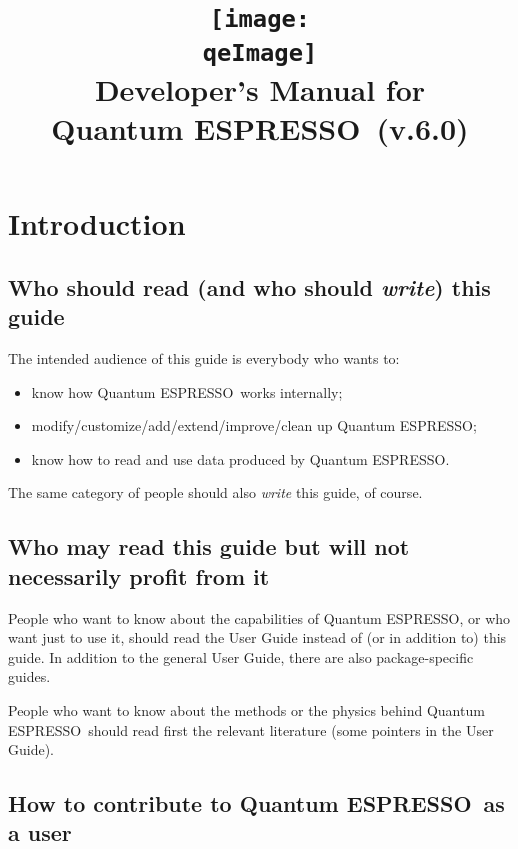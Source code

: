 \documentclass[12pt,a4paper]{article}
\def\version{6.0}
\def\qe{{\sc Quantum ESPRESSO}}
\def\qeImage{quantum_espresso.pdf}
\begin{document}
\author{}
\date{}
\title{
  \texttt{[image: \\qeImage]} \\
  \Huge Developer's Manual for \\ \qe\ (v.\version)
}
\maketitle

\tableofcontents

\newpage

\section{Introduction}

\subsection{Who should read (and who should {\em write}) this guide}

The intended audience of this guide is everybody who wants to:
\begin{itemize}
\item know how \qe\ works internally;
\item modify/customize/add/extend/improve/clean up \qe;
\item know how to read and use data produced by \qe.
\end{itemize}
The same category of people should also {\em write} this guide, of course.

\subsection{Who may read this guide but will not necessarily profit from it}

People who want to know about the capabilities of \qe,
or who want just to use it, should read the User Guide
instead of (or in addition to) this guide. In addition
to the general User Guide, there are also package-specific
guides.

People who want to know about the methods or the physics
behind \qe\ should read first the relevant
literature (some pointers in the User Guide).

\subsection{How to contribute to \qe\ as a user}
\end{document}
